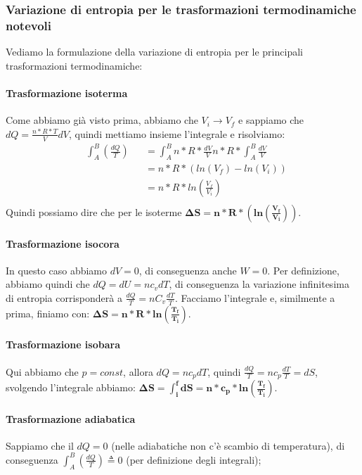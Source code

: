            \subsubsection{Variazione di entropia per le trasformazioni termodinamiche notevoli}
                Vediamo la formulazione della variazione di entropia per le principali trasformazioni termodinamiche:
                \paragraph{Trasformazione isoterma}
                    Come abbiamo già visto prima, abbiamo che $V_i \rightarrow V_f$ e sappiamo che $dQ = \frac{n*R*T}{V}dV$, quindi mettiamo insieme l'integrale e risolviamo:
                    \begin{align*}
                        &\int_A^B(\frac{dQ}{T}) &&= \int_A^Bn*R*\frac{dV}{V}n*R*\int_A^B\frac{dV}{V}\\
                         & && = n*R*(ln(V_f)-ln(V_i))\\
                         & && = n*R*ln(\frac{V_f}{V_i})\\
                    \end{align*}
                    Quindi possiamo dire che per le isoterme \textcolor{OliveGreen}{$\mathbf{\Delta S = n*R*(ln(\frac{V_f}{V_i}))}$}.
                \paragraph{Trasformazione isocora}
                    In questo caso abbiamo $dV = 0$, di conseguenza anche $W=0$. Per definizione, abbiamo quindi che $dQ = dU = nc_vdT$, di conseguenza la variazione infinitesima di entropia corrisponderà a $\frac{dQ}{T} = nC_v\frac{dT}{T}$. Facciamo l'integrale e, similmente a prima, finiamo con: \textcolor{OliveGreen}{$\mathbf{\Delta S = n*R*ln(\frac{T_f}{T_i})}$}.
                \paragraph{Trasformazione isobara}
                    Qui abbiamo che $p = const$, allora $dQ = nc_pdT$, quindi $\frac{dQ}{T} = nc_p\frac{dT}{T} = dS$, svolgendo l'integrale abbiamo: \textcolor{OliveGreen}{$\mathbf{\Delta S = \int_i^fdS = n*c_p*ln(\frac{T_f}{T_i})}$}.
                \paragraph{Trasformazione adiabatica}
                    Sappiamo che il $dQ = 0$ (nelle adiabatiche non c'è scambio di temperatura), di conseguenza $\int_A^B(\frac{dQ}{T})\triangleq 0$ (per definizione degli integrali);

